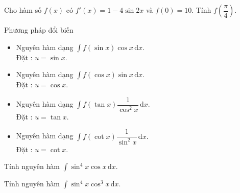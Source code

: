 \begin{bt}%
	Cho hàm số $f(x)$ có $f'(x)=1-4\sin{2x}$ và $f(0)=10$. Tính $f\left(\dfrac{\pi}{4}\right)$.
\end{bt}
\begin{dang}{Phương pháp đổi biến}
	\begin{itemize}
		\item Nguyên hàm dạng $ \displaystyle\int\limits f(\sin x)\cos x \mathrm{\,d}x .$\\
		Đặt : $ u=\sin x .$
		\item Nguyên hàm dạng $ \displaystyle\int\limits f(\cos x)\sin x \mathrm{\,d}x .$\\
		Đặt : $ u=\cos x .$
		\item Nguyên hàm dạng $ \displaystyle\int\limits f(\tan x)\dfrac{1}{\cos^2x} \mathrm{\,d}x .$\\
		Đặt : $ u=\tan x .$
		\item Nguyên hàm dạng $ \displaystyle\int\limits f(\cot x)\dfrac{1}{\sin^2x} \mathrm{\,d}x .$\\
		Đặt : $ u=\cot x .$
	\end{itemize}
\end{dang}
\begin{vd}%
	Tính nguyên hàm $ \displaystyle\int\limits \sin^4x\cos x \mathrm{\,d}x .$
\end{vd}
\begin{vd}%
	Tính nguyên hàm $ \displaystyle\int\limits \sin^4x\cos^3x \mathrm{\,d}x .$
\end{vd}
